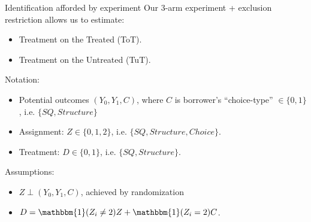 \documentclass[9pt, aspectratio=169]{beamer}
\begin{document}
 
\begin{frame}{Identification afforded by experiment}
Our 3-arm experiment + exclusion restriction allows us to estimate: 
\begin {itemize}
 \item Treatment on the Treated (ToT).
 \item Treatment on the Untreated (TuT).
\end{itemize}
\vspace{.1in}
Notation: 
\begin{itemize}
    \item Potential outcomes $(Y_0,Y_1,C)$, where $C$ is borrower's ``choice-type'' $\in\{0,1\}$, i.e. $\{SQ,Structure\}$
    \item Assignment: $Z \in \{0,1,2\}$, i.e. $\{SQ,Structure,Choice\}$.  
    \item Treatment: $D \in \{0,1\} $, i.e. $\{SQ,Structure\}$.
\end{itemize}
\vspace{.1in}
Assumptions:
\begin{itemize}
    \item $Z \perp (Y_0,Y_1,C)$, achieved by randomization
    \item $D = \mathbbm{1}(Z_i \neq 2) Z + \mathbbm{1}(Z_i=2) C$.
\end{itemize}
\end{frame}
\end{document}
